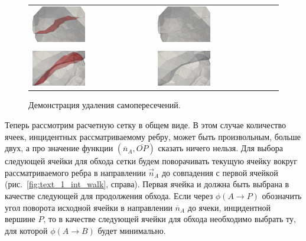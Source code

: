 \begin{figure}[ht]
\centering
\begin{tabular}{ll}
\includegraphics[width=0.45\textwidth]{./pics/text_1_int/pic_self_intersection_on.png}
&
\includegraphics[width=0.45\textwidth]{./pics/text_1_int/pic_self_intersection_off.png} \\
\\
\includegraphics[width=0.45\textwidth]{./pics/text_1_int/pic_self_intersection_on_2.png}
&
\includegraphics[width=0.45\textwidth]{./pics/text_1_int/pic_self_intersection_off_2.png}
\end{tabular}
\singlespacing
{}\caption{Демонстрация удаления самопересечений.}
\label{fig:text_1_int_selfintoff2}
\end{figure}

Теперь рассмотрим расчетную сетку в общем виде.
В этом случае количество ячеек, инцидентных рассматриваемому ребру, может быть произвольным, больше двух, а про значение функции $(\overline{n}_A, \overline{OP})$ сказать ничего нельзя.
Для выбора следующей ячейки для обхода сетки будем поворачивать текущую ячейку вокруг рассматриваемого ребра в направлении $\vec{n}_A$ до совпадения с первой ячейкой (рис.~\ref{fig:text_1_int_walk}, справа).
Первая ячейка и должна быть выбрана в качестве следующей для продолжения обхода.
Если через $\phi(A \rightarrow P)$  обозначить угол поворота исходной ячейки в направлении $\overline{n}_A$ до ячеки, инцидентной вершине $P$, то в качестве следующей ячейки для обхода необходимо выбрать ту, для которой $\phi(A \rightarrow B)$ будет минимально.

